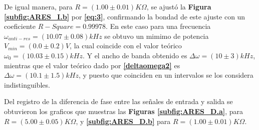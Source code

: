 \documentclass[11pt,a4paper]{article}
\begin{document}
De igual manera, para $R=(1.00 \pm 0.01)K\Omega$, se ajustó la \textbf{Figura \ref{subfig:ARES_I.b}} por \textbf{\eqref{eq:3}}, confirmando la bondad de este ajuste con un coeficiente $R-Square = 0.99978$. En este caso para una frecuencia $\omega_{anti-res} =(10.07 \pm 0.08)kHz$ se obtuvo un mimimo de potencia $V_{min} = (0.0 \pm 0.2)V$, la cual coincide con el valor teórico $\omega_0 = (10.03 \pm 0.15) kHz$. Y el ancho de banda obtenido es $\Delta\omega = (10 \pm 3)kHz$, mientras que el valor teórico dado por \textbf{\eqref{deltaomega2}} es $\Delta\omega = (10.1 \pm 1.5)kHz$, y puesto que coinciden en un intervalos se los considera indistinguibles.

\bigskip

Del registro de la diferencia de fase entre las señales de entrada y salida se obtuvieron los graficos que muestras las \textbf{Figuras \ref{subfig:ARES_D.a}}, para $R=(5.00 \pm 0.05)K\Omega$, y \textbf{\ref{subfig:ARES_D.b}} para $R=(1.00 \pm 0.01)K\Omega$.
\end{document}
